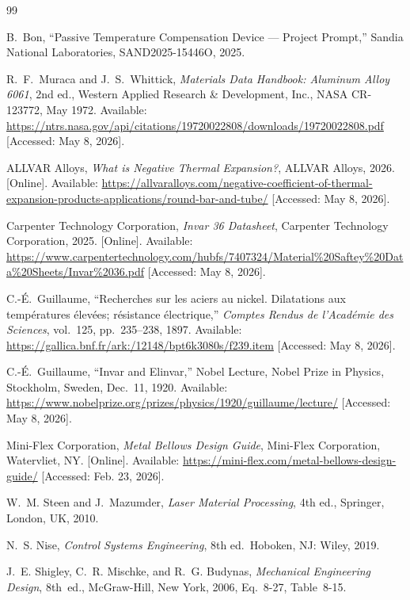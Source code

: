 \documentclass[12pt, letterpaper]{report}%
\begin{document}
\begin{thebibliography}{99}

    B.\ Bon, ``Passive Temperature Compensation Device --- Project Prompt,''
    Sandia National Laboratories, SAND2025-15446O, 2025.

    R.\ F.\ Muraca and J.\ S.\ Whittick, \textit{Materials Data Handbook:
    Aluminum Alloy 6061}, 2nd ed., Western Applied Research \& Development,
    Inc., NASA CR-123772, May 1972. Available:
    \url{https://ntrs.nasa.gov/api/citations/19720022808/downloads/19720022808.pdf}
    [Accessed: May 8, 2026].

    ALLVAR Alloys, \textit{What is Negative Thermal Expansion?}, ALLVAR Alloys,
    2026. [Online]. Available:
    \url{https://allvaralloys.com/negative-coefficient-of-thermal-expansion-products-applications/round-bar-and-tube/}
    [Accessed: May 8, 2026].

    Carpenter Technology Corporation, \textit{Invar 36 Datasheet}, Carpenter
    Technology Corporation, 2025. [Online]. Available:
    \url{https://www.carpentertechnology.com/hubfs/7407324/Material%20Saftey%20Data%20Sheets/Invar%2036.pdf}
    [Accessed: May 8, 2026].

    C.-\'{E}.\ Guillaume, ``Recherches sur les aciers au nickel. Dilatations
    aux temp\'{e}ratures \'{e}lev\'{e}es; r\'{e}sistance \'{e}lectrique,''
    \textit{Comptes Rendus de l'Acad\'{e}mie des Sciences}, vol.~125,
    pp.~235--238, 1897. Available:
    \url{https://gallica.bnf.fr/ark:/12148/bpt6k3080s/f239.item}
    [Accessed: May 8, 2026].

    C.-\'{E}.\ Guillaume, ``Invar and Elinvar,'' Nobel Lecture, Nobel Prize
    in Physics, Stockholm, Sweden, Dec.\ 11, 1920. Available:
    \url{https://www.nobelprize.org/prizes/physics/1920/guillaume/lecture/}
    [Accessed: May 8, 2026].

    Mini-Flex Corporation, \textit{Metal Bellows Design Guide}, Mini-Flex
    Corporation, Watervliet, NY. [Online]. Available:
    \url{https://mini-flex.com/metal-bellows-design-guide/}
    [Accessed: Feb. 23, 2026].

    W.~M. Steen and J.~Mazumder, \textit{Laser Material Processing}, 4th ed.,
    Springer, London, UK, 2010.

    N.~S. Nise, \textit{Control Systems Engineering}, 8th ed.\ Hoboken, NJ:
    Wiley, 2019.

    J.~E. Shigley, C.~R. Mischke, and R.~G. Budynas,
    \textit{Mechanical Engineering Design}, 8th~ed., McGraw-Hill, New York,
    2006, Eq.~8-27, Table~8-15.

\end{thebibliography}
\end{document}
